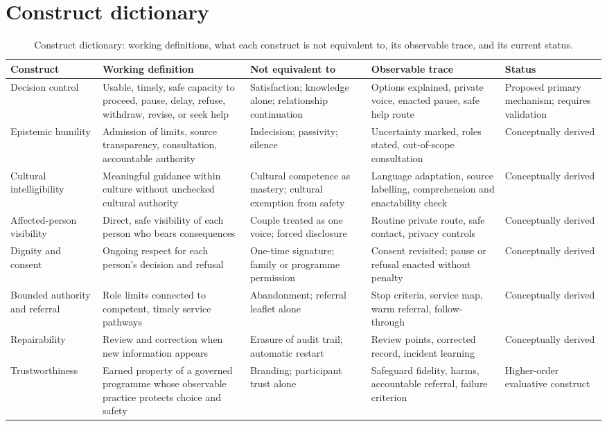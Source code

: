\documentclass[11pt]{article}
\begin{document}
\section{Construct dictionary}
\label{sec:S5}
\footnotesize
\begin{table}[H]
\centering\footnotesize
\caption{Construct dictionary: working definitions, what each construct is not equivalent to, its observable trace, and its current status.}
\label{tab:S5}
\begin{tabularx}{\textwidth}{@{}p{2.6cm}YYYp{2.6cm}@{}}
\toprule
\textbf{Construct} & \textbf{Working definition} & \textbf{Not equivalent to} & \textbf{Observable trace} & \textbf{Status}\\
\midrule
Decision control & Usable, timely, safe capacity to proceed, pause, delay, refuse, withdraw, revise, or seek help & Satisfaction; knowledge alone; relationship continuation & Options explained, private voice, enacted pause, safe help route & Proposed primary mechanism; requires validation\\
Epistemic humility & Admission of limits, source transparency, consultation, accountable authority & Indecision; passivity; silence & Uncertainty marked, roles stated, out-of-scope consultation & Conceptually derived\\
Cultural intelligibility & Meaningful guidance within culture without unchecked cultural authority & Cultural competence as mastery; cultural exemption from safety & Language adaptation, source labelling, comprehension and enactability check & Conceptually derived\\
Affected-person visibility & Direct, safe visibility of each person who bears consequences & Couple treated as one voice; forced disclosure & Routine private route, safe contact, privacy controls & Conceptually derived\\
Dignity and consent & Ongoing respect for each person's decision and refusal & One-time signature; family or programme permission & Consent revisited; pause or refusal enacted without penalty & Conceptually derived\\
Bounded authority and referral & Role limits connected to competent, timely service pathways & Abandonment; referral leaflet alone & Stop criteria, service map, warm referral, follow-through & Conceptually derived\\
Repairability & Review and correction when new information appears & Erasure of audit trail; automatic restart & Review points, corrected record, incident learning & Conceptually derived\\
Trustworthiness & Earned property of a governed programme whose observable practice protects choice and safety & Branding; participant trust alone & Safeguard fidelity, harms, accountable referral, failure criterion & Higher-order evaluative construct\\
\bottomrule
\end{tabularx}
\end{table}
\end{document}
